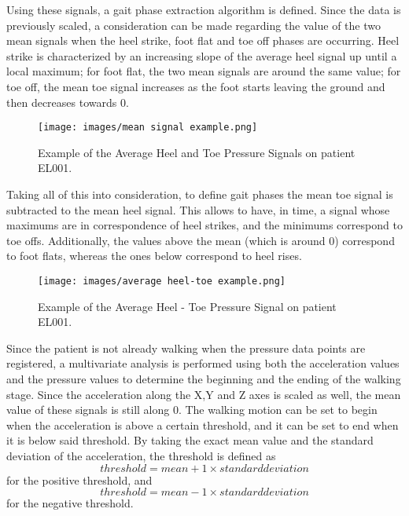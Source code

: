 Using these signals, a gait phase extraction algorithm is defined. Since the data is previously scaled, a consideration can be made regarding the value of the two mean signals when the heel strike, foot flat and toe off phases are occurring.
Heel strike is characterized by an increasing slope of the average heel signal up until a local maximum; for foot flat, the two mean signals are around the same value; for toe off, the mean toe signal increases as the foot starts leaving the ground and then decreases towards 0.
\begin{figure}[h!]
    \centering
    \texttt{[image: images/mean signal example.png]}
    \caption{Example of the Average Heel and Toe Pressure Signals on patient EL001.}
    \label{fig:Example of the Average Heel and Toe Pressure Signals on patient EL001.}
\end{figure}

Taking all of this into consideration, to define gait phases the mean toe signal is subtracted to the mean heel signal. This allows to have, in time, a signal whose maximums are in correspondence of heel strikes, and the minimums correspond to toe offs. Additionally, the values above the mean (which is around 0) correspond to foot flats, whereas the ones below correspond to heel rises. 

\begin{figure}[h!]
    \centering
    \texttt{[image: images/average heel-toe example.png]}
    \caption{Example of the Average Heel - Toe Pressure Signal on patient EL001.}
    \label{fig:Example of the Average Heel - Toe Pressure Signal on patient EL001.}
\end{figure}

Since the patient is not already walking when the pressure data points are registered, a multivariate analysis is performed using both the acceleration values and the pressure values to determine the beginning and the ending of the walking stage. 
Since the acceleration along the X,Y and Z axes is scaled as well, the mean value of these signals is still along 0. 
The walking motion can be set to begin when the acceleration is above a certain threshold, and it can be set to end when it is below said threshold. By taking the exact mean value and the standard deviation of the acceleration, the threshold is defined as
\begin{equation}
    threshold = mean + 1 \times standard deviation
\end{equation}
for the positive threshold, and
\begin{equation}
    threshold = mean - 1 \times standard deviation
\end{equation}
for the negative threshold.

